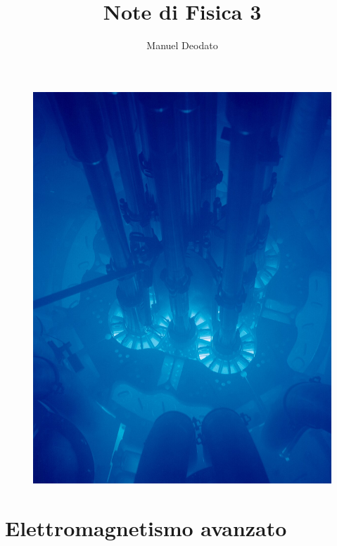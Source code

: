 \documentclass[10pt, a4paper]{scrartcl}
\title{Note di Fisica 3}
\author{Manuel Deodato}
\date{}
\renewcommand{\maketitle}{
\begin{center}
{\sffamily
{\fontsize{20}{20}\selectfont\MakeUppercase\thetitle}}

\vspace{0.2in}

{\large\scshape\sffamily\theauthor}
\end{center}
}
\numberwithin{equation}{subsection}
\theoremstyle{style1}
\begin{document}
\maketitle
\vspace{15em}
\begin{figure}[h!]
	\centering
	\includegraphics[width=.8\columnwidth]{wallp.jpg}
\end{figure}
\newpage
\tableofcontents 
\newpage
\section{Elettromagnetismo avanzato}
\end{document}
